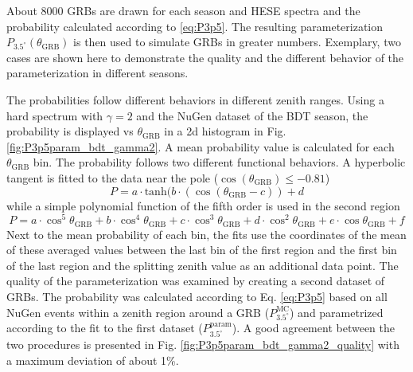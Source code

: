 About 8000 GRBs are drawn for each season and HESE spectra
and the probability calculated according to \ref{eq:P3p5}. The resulting 
parameterization 
$P_{3.5^\circ}(\theta_\text{GRB})$ is then used to simulate GRBs in greater 
numbers.
Exemplary, two cases are shown here to demonstrate the quality and the 
different behavior of the parameterization in different seasons.

The probabilities follow different behaviors in different zenith ranges. Using 
a 
hard spectrum with $\gamma=2$ and the NuGen dataset of the BDT season, the 
probability is displayed  vs
$\theta_\text{GRB}$ in a 2d histogram in Fig. \ref{fig:P3p5param_bdt_gamma2}. A 
mean probability value is calculated for each $\theta_\text{GRB}$ bin.
The probability follows two different functional behaviors. A hyperbolic 
tangent is fitted to the data near the pole ($\cos(\theta_\text{GRB}) 
\leq -0.81$)
\begin{equation}
\label{eq:Ptanh}
 P = a \cdot \text{tanh}(b \cdot (\cos(\theta_\text{GRB}- c)) + d
\end{equation}
while a simple polynomial function of the fifth order is used in the second 
region
\begin{equation}
\label{eq:PPoly}
 P = a \cdot \cos^5\theta_\text{GRB} + b \cdot 
\cos^4\theta_\text{GRB} + c \cdot \cos^3\theta_\text{GRB} + d 
\cdot \cos^2\theta_\text{GRB} + e \cdot \cos\theta_\text{GRB} + f
\end{equation}
Next to the mean probability of each bin, the fits use the coordinates of 
the mean of these averaged values between the 
last bin of the first region and the first bin of the last region and the 
splitting zenith value as an additional data point.
The quality of the parameterization was examined by creating a second dataset 
of GRBs. The probability was calculated according to Eq. 
\ref{eq:P3p5} based on all 
NuGen events within a zenith region around a GRB ($P_{3.5^\circ}^\text{MC}$) 
and parametrized according to the fit to the first 
dataset ($P_{3.5^\circ}^\text{param}$).
A good agreement between the two procedures is presented in Fig. 
\ref{fig:P3p5param_bdt_gamma2_quality} with a maximum deviation of about 1\%.

